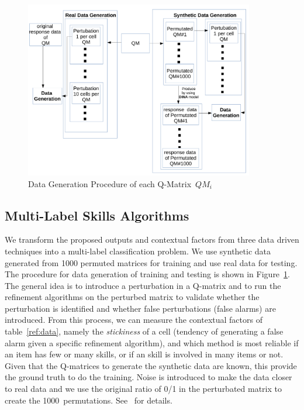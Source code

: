 \documentclass[runningheads,a4paper]{llncs}
\begin{document}
\begin{figure}
  \centering
    \includegraphics[width=100mm ,scale=0.5]{graph/DG.pdf}
  \caption{Data Generation Procedure of each Q-Matrix~$QM_i$}  \label{fig:DG}
\end{figure}

\subsection{Multi-Label Skills Algorithms}

We transform the proposed outputs and contextual factors from three data driven techniques into a multi-label classification problem. We use synthetic data generated from 1000 permuted matrices for training  and use real data for testing. The procedure for data generation of training and testing is shown in Figure~\ref{fig:DG}. The general idea is to introduce a perturbation in a Q-matrix and to run the refinement algorithms on the perturbed matrix to validate whether the perturbation is identified and whether false perturbations (false alarms) are introduced.  From this process, we can measure the contextual factors of table~\ref{ref:data}, namely the \textit{stickiness} of a cell (tendency of generating a false alarm given a specific refinement algorithm), and which method is most reliable if an item has few or many skills, or if an skill is involved in many items or not.  Given that the Q-matrices to generate the synthetic data are known, this provide the ground truth to do the training.  Noise is introduced to make the data closer to real data and we use the original ratio of 0/1 in the perturbated matrix to create the 1000~permutations.  See~\cite{desmarais2015combining} for details.
\end{document}
